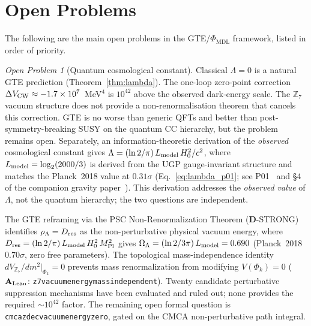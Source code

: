 \documentclass[11pt]{article}
\theoremstyle{remark}
\newtheorem{openprob}[theorem]{Open Problem}
\newcommand{\PHIMDL}{\Phi_{\mathrm{MDL}}}
\newcommand{\ZS}{\mathbb{Z}_7}
\newcommand{\lean}[1]{%
  \penalty-100
  \begingroup\def\_{\textunderscore\allowbreak}\texttt{#1}\endgroup}
\newcommand{\CatAL}{\ensuremath{\textbf{A}_{\rm Lean}}}
\newcommand{\CatD}{\textbf{D}}
\begin{document}
\section{Open Problems}
\label{sec:open}

The following are the main open problems in the GTE/$\PHIMDL$ framework,
listed in order of priority.

\begin{openprob}[Quantum cosmological constant]
\label{oprob:CC}
Classical $\Lambda = 0$ is a natural GTE prediction (Theorem~\ref{thm:lambda}).
The one-loop zero-point correction $\Delta V_{\rm CW} \approx -1.7\times10^{7}$~MeV$^4$
is $10^{42}$ above the observed dark-energy scale.  The $\ZS$ vacuum structure
does not provide a non-renormalisation theorem that cancels this correction.
GTE is no worse than generic QFTs and better than post-symmetry-breaking SUSY
on the quantum CC hierarchy, but the problem remains open.
Separately, an information-theoretic derivation of the \textit{observed}
cosmological constant gives $\Lambda = (\ln 2/\pi)\,L_{\rm model}\,H_0^2/c^2$,
where $L_{\rm model} = \log_2(2000/3)$ is derived from the UGP gauge-invariant
structure and matches the Planck~2018 value at $0.31\sigma$
(Eq.~\eqref{eq:lambda_p01}; see P01~\cite{Spivack2026_SM_UGP} and \S4
of the companion gravity paper~\cite{SpivackPhiMDLGravity}).
This derivation addresses the \textit{observed value} of $\Lambda$, not the
quantum hierarchy; the two questions are independent.

The GTE reframing via the PSC Non-Renormalization Theorem ($\CatD$-STRONG)
identifies $\rho_\Lambda = D_{\rm res}$ as the non-perturbative physical vacuum
energy, where $D_{\rm res} = (\ln 2/\pi)\,L_{\rm model}\,H_0^2\,M_{\rm Pl}^2$
gives $\Omega_\Lambda = (\ln 2/3\pi)\,L_{\rm model} = 0.690$ (Planck~2018
$0.70\sigma$, zero free parameters).
The topological mass-independence identity $dV_{\ZS}/dm^2|_{\Phi_k} = 0$
prevents mass renormalization from modifying $V(\Phi_k)=0$
($\CatAL$: \lean{z7\_vacuum\_energy\_mass\_independent}).
Twenty candidate perturbative suppression mechanisms have been evaluated and
ruled out; none provides the required $\sim10^{42}$ factor.
The remaining open formal question is \lean{cmca\_zdec\_vacuum\_energy\_zero},
gated on the CMCA non-perturbative path integral.
\end{openprob}
\end{document}
